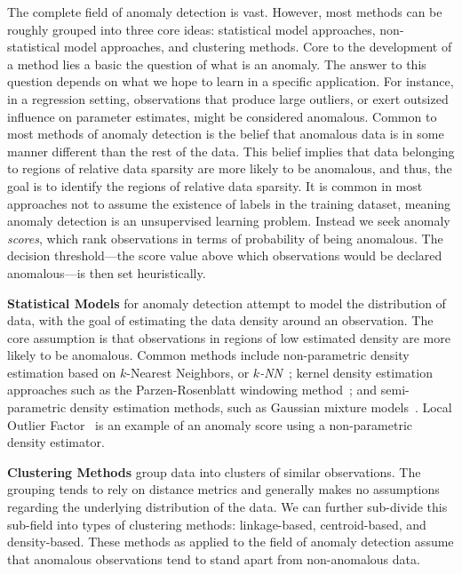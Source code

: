 
The complete field of anomaly detection is vast.  However, most methods can be 
    roughly grouped into three core ideas: statistical model approaches, 
    non-statistical model approaches, and clustering methods. Core to the 
    development of a method lies a basic the question of what is an anomaly.  
    The answer to this question depends on what we hope to
    learn in a specific application.  For instance, in a regression setting, 
    observations that produce large outliers, or exert outsized influence on parameter 
    estimates, might be considered anomalous.  Common to most 
    methods of anomaly detection is the belief that anomalous data is in some 
    manner different than the rest of the data. This belief implies that data 
    belonging to regions of relative data sparsity are more likely to be 
    anomalous, and thus, the goal is to identify the regions of relative 
    data sparsity. It is common in most approaches not to assume the existence of 
    labels in the training dataset, meaning anomaly detection is an unsupervised learning
    problem.  Instead we seek anomaly \emph{scores}, which rank observations in terms of
    probability of being anomalous.  The decision threshold---the score value above which
    observations would be declared anomalous---is then set heuristically.
    

{\bf Statistical Models} for anomaly detection attempt to model the distribution of data, 
    with the goal of estimating the data density around an observation. The core assumption 
    is that observations in regions of low estimated density are more likely to be anomalous.  
    Common methods include non-parametric density estimation based on $k$-Nearest Neighbors, 
    or \emph{$k$-NN}~\citep{kramer2013}; kernel density estimation approaches such as the 
    Parzen-Rosenblatt windowing method~\citep{parzen1962,rosenblatt1956}; and semi-parametric
    density estimation methods, such as Gaussian mixture models~\citep{mcnicholas2010}.
    Local Outlier Factor~\cite{breunig2000} is an example of an anomaly score using a
    non-parametric density estimator.

{\bf Clustering Methods} group data into clusters of similar observations.
    The grouping tends to rely on distance metrics and generally makes no assumptions 
    regarding the underlying distribution of the data.  We can further sub-divide this 
    sub-field into types of clustering methods: linkage-based, centroid-based, and density-based. 
    These methods as applied to the field of anomaly detection assume that anomalous observations
    tend to stand apart from non-anomalous data.

